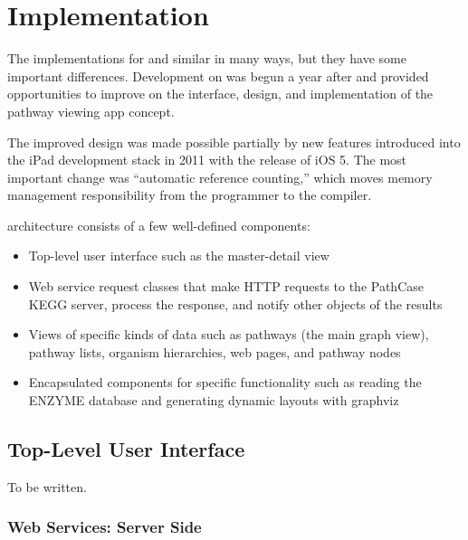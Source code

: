 \section{Implementation}
\label{sect:kegg_implementation}

The implementations for \mawapp and \keggapp similar in many ways, but they have
some important differences. Development on \keggapp was begun a year after
\mawapp and provided opportunities to improve on the interface, design, and
implementation of the pathway viewing app concept.

The improved design was made possible partially by new features introduced into
the iPad development stack in 2011 with the release of iOS 5. The most important
change was ``automatic reference counting,'' which moves memory management
responsibility from the programmer to the compiler. 

\keggappp architecture consists of a few well-defined components:

\begin{itemize}

    \item Top-level user interface such as the master-detail view
    
    \item Web service request classes that make HTTP requests to the PathCase
        KEGG server, process the response, and notify other objects of the
        results

    \item Views of specific kinds of data such as pathways (the main graph
        view), pathway lists, organism hierarchies, web pages, and pathway nodes

    \item Encapsulated components for specific functionality such as reading the
        ENZYME database and generating dynamic layouts with graphviz

\end{itemize}

\subsection{Top-Level User Interface}
\label{sect:kegg_impl_top_level_ui}

To be written.

\subsubsection{Web Services: Server Side}


